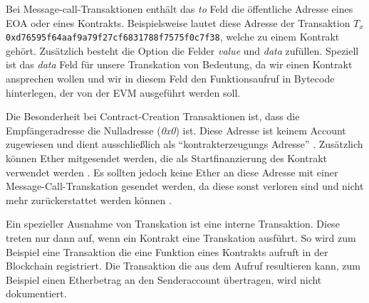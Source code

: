 \documentclass[runningheads]{llncs}
\begin{document}
Bei Message-call-Transaktionen enthält das \textit{to} Feld die öffentliche Adresse eines EOA oder eines Kontrakts. Beispielsweise lautet diese Adresse  der Transaktion $T_x$ \verb+0xd76595f64aaf9a79f27cf6831788f7575f0c7f38+, welche zu einem Kontrakt gehört. Zusätzlich besteht die Option die Felder \textit{value} und \textit{data} zufüllen. Speziell ist das \textit{data} Feld für unsere Transkation von Bedeutung, da wir einen Kontrakt ansprechen wollen und wir in diesem Feld den Funktionsaufruf in Bytecode hinterlegen, der von der EVM ausgeführt werden soll.

Die Besonderheit bei Contract-Creation Transaktionen ist, dass die Empfängeradresse die Nulladresse (\textit{0x0}) ist. Diese Adresse ist keinem Account zugewiesen und dient ausschließlich als "`kontrakterzeugungs Adresse"' \cite{antonopoulos_mastering_2019}. Zusätzlich können Ether mitgesendet werden, die als Startfinanzierung des Kontrakt verwendet werden \cite[S. 4]{wood_ethereum/yellowpaper_2019}. Es sollten jedoch keine Ether an diese Adresse mit einer Message-Call-Transkation gesendet werden, da diese sonst verloren sind und nicht mehr zurückerstattet werden können \cite[S. 112]{antonopoulos_mastering_2019}.

Ein spezieller Ausnahme von Transkation ist eine interne Transaktion. Diese treten nur dann auf, wenn ein Kontrakt eine Transkation ausführt. So wird zum Beispiel eine Transaktion die eine Funktion eines Kontrakts aufruft in der Blockchain registriert. Die Transaktion die aus dem Aufruf resultieren kann, zum Beispiel einen Etherbetrag an den Senderaccount übertragen, wird nicht dokumentiert\cite[S. 40]{antonopoulos_mastering_2019}.
\end{document}
